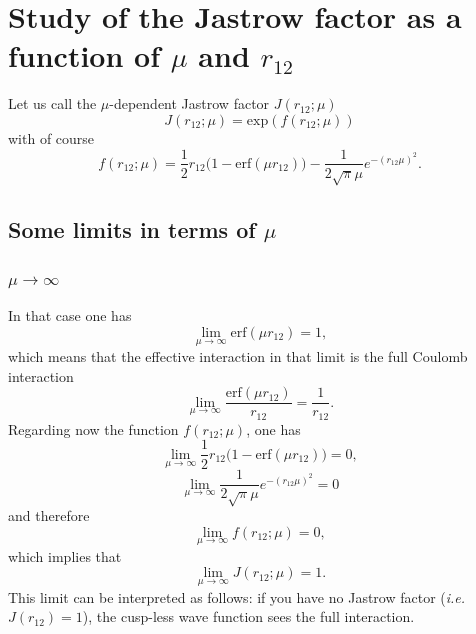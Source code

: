 \documentclass[aip,jcp,reprint,noshowkeys,superscriptaddress]{revtex4-1}
\begin{document}
\section{Study of the Jastrow factor as a function of $\mu$ and $r_{12}$}
Let us call the $\mu$-dependent Jastrow factor $J(r_{12};\mu)$
\begin{equation}
 J(r_{12};\mu) = \text{exp}(f(r_{12};\mu))
\end{equation}
with of course 
\begin{equation}
 f(r_{12};\mu) = \frac{1}{2}r_{12}\bigg( 1 - \text{erf}(\mu r_{12})  \bigg) - \frac{1}{2\sqrt{\pi}\mu}e^{-(r_{12}\mu)^2}.
\end{equation}
\subsection{Some limits in terms of $\mu$}
\subsubsection{$\mu \rightarrow \infty$}
In that case one has
\begin{equation}
 \lim_{\mu \rightarrow \infty} \text{erf}(\mu r_{12}) = 1,
\end{equation}
which means that the effective interaction in that limit is the full Coulomb interaction
\begin{equation}
 \lim_{\mu \rightarrow \infty} \frac{\text{erf}(\mu r_{12})}{r_{12}} = \frac{1}{r_{12}}.
\end{equation}
Regarding now the function $f(r_{12};\mu)$, one has 
\begin{equation}
 \lim_{\mu \rightarrow \infty} \frac{1}{2}r_{12}\bigg( 1 - \text{erf}(\mu r_{12})  \bigg) = 0,
\end{equation}
\begin{equation}
 \lim_{\mu \rightarrow \infty} \frac{1}{2\sqrt{\pi}\mu}e^{-(r_{12}\mu)^2} = 0
\end{equation}
and therefore 
\begin{equation}
 \lim_{\mu \rightarrow \infty} f(r_{12};\mu) = 0,
\end{equation}
which implies that 
\begin{equation}
 \lim_{\mu \rightarrow \infty} J(r_{12};\mu) = 1. 
\end{equation}
This limit can be interpreted as follows: if you have no Jastrow factor (\textit{i.e.}$J(r_{12})=1$), the cusp-less wave function sees the full interaction.
\end{document}
